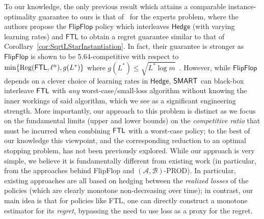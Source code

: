 To our knowledge, the only previous result which attains a comparable instance-optimality guarantee to ours is that of~\cite{de2014follow} for the experts problem, where the authors propose the $\mathsf{FlipFlop}$ policy which interleaves $\mathsf{Hedge}$ (with varying learning rates) and $\mathsf{FTL}$ to obtain a regret guarantee similar to that of Corollary~\ref{cor:SqrtLStarInstantiation}. In fact, their guarantee is stronger as $\mathsf{FlipFlop}$ is shown to be 5.64-competitive with respect to $\min\{\mathrm{Reg}(\mathsf{FTL},\ell^n), g(L^*)\}$ where $g(L^*) \le \sqrt{L^* \log m}$~\citep[Corollary 16]{de2014follow}. However, 
while $\mathsf{FlipFlop}$ depends on a clever choice of learning rates in $\mathsf{Hedge}$, $\mathsf{SMART}$ can black-box interleave $\mathsf{FTL}$ with \emph{any} worst-case/small-loss algorithm without knowing the inner workings of said algorithm, which we see as a significant engineering strength. More importantly, our approach to this problem is distinct as we focus on the fundamental limits (upper and lower bounds) on the \emph{competitive ratio} that must be incurred when combining $\mathsf{FTL}$ with a worst-case policy; to the best of our knowledge this viewpoint, and the corresponding reduction to an optimal stopping problem, has not been previously explored. While our approach is very simple, we believe it is fundamentally different from existing work (in particular, from the approaches behind FlipFlop and $(\mathcal{A},\mathcal{B})$-PROD). In particular, existing approaches are all based on hedging between the \emph{realized losses} of the policies (which are clearly monotone non-decreasing over time); in contrast, our main idea is that for policies like FTL, one can directly construct a monotone estimator for its \emph{regret}, bypassing the need to use loss as a proxy for the regret.

